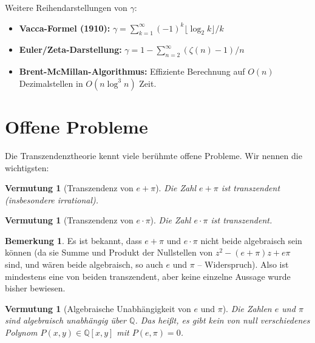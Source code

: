\documentclass[12pt,a4paper]{amsart}
\newtheorem{conjecture}[theorem]{Vermutung}
\theoremstyle{definition}
\newtheorem{bemerkung}[theorem]{Bemerkung}
\begin{document}
Weitere Reihendarstellungen von $\gamma$:
\begin{itemize}[leftmargin=2em]
  \item \textbf{Vacca-Formel (1910):} $\gamma = \sum_{k=1}^\infty (-1)^k
        \lfloor \log_2 k \rfloor / k$
  \item \textbf{Euler/Zeta-Darstellung:} $\gamma = 1 - \sum_{n=2}^\infty
        (\zeta(n) - 1)/n$
  \item \textbf{Brent-McMillan-Algorithmus:} Effiziente Berechnung auf
        $O(n)$ Dezimalstellen in $O(n \log^3 n)$ Zeit.
\end{itemize}


\section{Offene Probleme}
\label{sec:offen}

Die Transzendenztheorie kennt viele berühmte offene Probleme. Wir nennen die
wichtigsten:

\begin{conjecture}[Transzendenz von $e + \pi$]
\label{verm:e+pi}
Die Zahl $e + \pi$ ist transzendent (insbesondere irrational).
\end{conjecture}

\begin{conjecture}[Transzendenz von $e \cdot \pi$]
\label{verm:e-pi}
Die Zahl $e \cdot \pi$ ist transzendent.
\end{conjecture}

\begin{bemerkung}
Es ist bekannt, dass $e + \pi$ und $e \cdot \pi$ nicht beide algebraisch sein
können (da sie Summe und Produkt der Nullstellen von $z^2 - (e+\pi)z + e\pi$
sind, und wären beide algebraisch, so auch $e$ und $\pi$ -- Widerspruch).
Also ist mindestens eine von beiden transzendent, aber keine einzelne Aussage
wurde bisher bewiesen.
\end{bemerkung}

\begin{conjecture}[Algebraische Unabhängigkeit von $e$ und $\pi$]
\label{verm:e-pi-unabh}
Die Zahlen $e$ und $\pi$ sind algebraisch unabhängig über $\mathbb{Q}$. Das
heißt, es gibt kein von null verschiedenes Polynom $P(x,y) \in \mathbb{Q}[x,y]$
mit $P(e,\pi) = 0$.
\end{conjecture}
\end{document}
